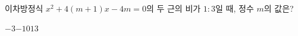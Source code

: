 이차방정식 $x^2+4(m+1)x-4m=0$의 두 근의 비가 $1:3$일 때, 정수 $m$의 값은?
\begin{choices32}{$-3$}{$-1$}{$0$}{$1$}{$3$}\end{choices32}
